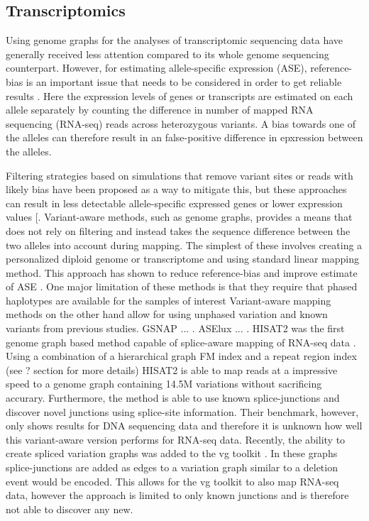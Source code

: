 \subsection{Transcriptomics}

Using genome graphs for the analyses of transcriptomic sequencing data have generally received less attention compared to its whole genome sequencing counterpart.
However, for estimating allele-specific expression (ASE), reference-bias is an important issue that needs to be considered in order to get reliable results \cite{Degner2009-vw,Castel2015-ef}.
Here the expression levels of genes or transcripts are estimated on each allele separately by counting the difference in number of mapped RNA sequencing (RNA-seq) reads across heterozygous variants.
A bias towards one of the alleles can therefore result in an false-positive difference in epxression between the alleles.

Filtering strategies based on simulations that remove variant sites or reads with likely bias have been proposed as a way to mitigate this, but these approaches can result in less detectable allele-specific expressed genes or lower expression values [\cite{Castel2015-ef,Van_de_Geijn2015-dz}.
Variant-aware methods, such as genome graphs, provides a means that does not rely on filtering and instead takes the sequence difference between the two alleles into account during mapping.
The simplest of these involves creating a personalized diploid genome or transcriptome and using standard linear mapping method.
This approach has shown to reduce reference-bias and improve estimate of ASE \cite{Rozowsky_2011,Raghupathy2018-sd,Lee2018-mm}.
One major limitation of these methods is that they require that phased haplotypes are available for the samples of interest 
Variant-aware mapping methods on the other hand allow for using unphased variation and known variants from previous studies.
GSNAP ... \cite{Wu2010-hv}. 
ASElux ... \cite{Miao2018-ps}.
HISAT2 was the first genome graph based method capable of splice-aware mapping of RNA-seq data \cite{Kim_2019}. 
Using a combination of a hierarchical graph FM index and a repeat region index (see ? section for more details) HISAT2 is able to map reads at a impressive speed to a genome graph containing 14.5M variations without sacrificing accurary. 
Furthermore, the method is able to use known splice-junctions and discover novel junctions using splice-site information.
Their benchmark, however, only shows results for DNA sequencing data and therefore it is unknown how well this variant-aware version performs for RNA-seq data.
Recently, the ability to create spliced variation graphs was added to the vg toolkit \cite{Garrison_2018}. 
In these graphs splice-junctions are added as edges to a variation graph similar to a deletion event would be encoded. 
This allows for the vg toolkit to also map RNA-seq data, however the approach is limited to only known junctions and is therefore not able to discover any new.

